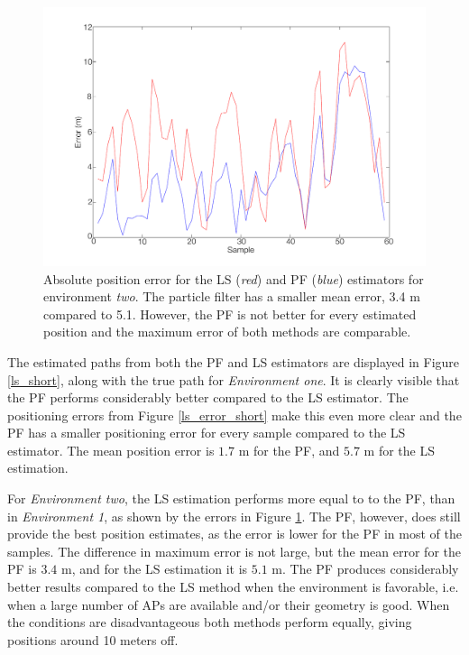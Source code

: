 \documentclass{LTHthesis}
\begin{document}
%
\begin{figure}[!hbt]

\includegraphics[width=1\textwidth ]{images/pure_rssi/ls_error_medium}
\caption{Absolute position error for the LS (\emph{red}) and PF (\emph{blue}) estimators for environment \emph{two}. The particle filter has a smaller mean error, 3.4 m compared to 5.1. However, the PF is not better for every estimated position and the maximum error of both methods are comparable.}\label{ls_error_medium}
\end{figure}

The estimated paths from both the PF and LS estimators are displayed in Figure \ref{ls_short}, along with the true path for \emph{Environment one}. It is clearly visible that the PF performs considerably better compared to the LS estimator. The positioning errors from Figure \ref{ls_error_short} make this even more clear and the PF has a smaller positioning error for every sample compared to the LS estimator. The mean position error is $1.7$ m for the PF, and $5.7$ m for the LS estimation.

For \emph{Environment two}, the LS estimation performs more equal to to the PF, than in \emph{Environment 1}, as shown by the errors in Figure \ref{ls_error_medium}. The PF, however, does still provide the best position estimates, as the error is lower for the PF in most of the samples. The difference in maximum error is not large, but the mean error for the PF is $3.4$ m, and for the LS estimation it is $5.1$ m. The PF produces considerably better results compared to the LS method when the environment is favorable, i.e. when a large number of APs are available and/or their geometry is good. When the conditions are disadvantageous both methods perform equally, giving positions around 10 meters off.
\end{document}
